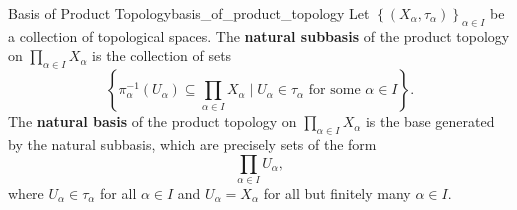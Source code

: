 \documentclass{report}
\begin{document}
\begin{definition}{Basis of Product Topology}{basis_of_product_topology}
	Let $\left\{(X_\alpha,\tau_\alpha)\right\}_{\alpha\in I}$ be a collection of topological spaces. The \textbf{natural subbasis} of the product topology on $\prod_{\alpha\in I}X_\alpha$ is the collection of sets 
	\[
		\left\{\pi_\alpha^{-1}(U_\alpha)\subseteq\prod_{\alpha\in I}X_\alpha\mid U_\alpha\in \tau_\alpha\text{ for some }\alpha\in I\right\}.
	\]
	The \textbf{natural basis} of the product topology on $\prod_{\alpha\in I}X_\alpha$ is the base generated by the natural subbasis, which are precisely sets of the form
	\[
		\prod_{\alpha\in I}U_\alpha,
	\]
	where $U_\alpha\in \tau_\alpha$ for all $\alpha\in I$ and $U_\alpha=X_\alpha$ for all but finitely many $\alpha\in I$.
\end{definition}
\end{document}

